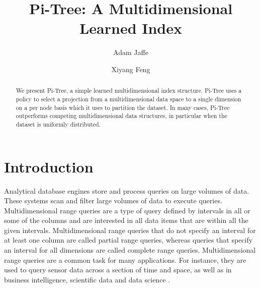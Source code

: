 \documentclass[sigconf,10pt]{acmart}
\begin{document}
\title{Pi-Tree: A Multidimensional Learned Index}


\author{Adam Jaffe}

\author{Xiyang Feng}



\begin{abstract}
  We present Pi-Tree, a simple learned multidimensional index structure.
  Pi-Tree uses a policy to select a projection from a multidimensional data space
  to a single dimension on a per node basis which it uses to partition the dataset.
  In many cases, Pi-Tree outperforms competing multidimensional data structures,
  in particular when the dataset is uniformly distributed.
\end{abstract}


\maketitle

\section{Introduction}

Analytical database engines store and process queries on large volumes of data.
These systems scan and filter large volumes of data to execute queries.
Multidimensional range queries are a type of query defined by 
intervals in all or some of the columns and are interested in all data items
that are within all the given intervals. Multidimensional range queries that do not specify
an interval for at least one column are called partial range queries, whereas queries that specify
an interval for all dimensions are called complete range queries.
Multidimensional range queries are a common task for many applications.
For instance, they are used to query sensor data across a section of time and space, as well as in business
intelligence, scientific data and data science \cite{ModernMDRQ}.
\end{document}
